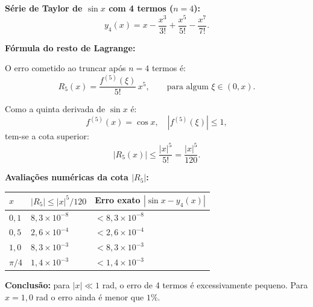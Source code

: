 \textbf{Série de Taylor de $\sin x$ com 4 termos ($n=4$):}
\[
y_4(x) = x - \frac{x^3}{3!} + \frac{x^5}{5!} - \frac{x^7}{7!}.
\]

\textbf{Fórmula do resto de Lagrange:}

O erro cometido ao truncar após $n=4$ termos é:
\[
R_5(x) = \frac{f^{(5)}(\xi)}{5!}\,x^5,\qquad\text{para algum }\xi\in(0,x).
\]

Como a quinta derivada de $\sin x$ é:
\[
f^{(5)}(x) = \cos x,\quad |f^{(5)}(\xi)|\leq1,
\]
tem-se a cota superior:
\[
|R_5(x)|\leq \frac{|x|^5}{5!}=\frac{|x|^5}{120}.
\]

\textbf{Avaliações numéricas da cota $|R_5|$:}
\begin{center}
\begin{tabular}{lll}
\hline
$x$ & $|R_5|\leq|x|^5/120$ & Erro exato $|\sin x - y_4(x)|$ \\
\hline
$0{,}1$ & $8{,}3\times10^{-8}$ & $<8{,}3\times10^{-8}$ \\
$0{,}5$ & $2{,}6\times10^{-4}$ & $<2{,}6\times10^{-4}$ \\
$1{,}0$ & $8{,}3\times10^{-3}$ & $<8{,}3\times10^{-3}$ \\
$\pi/4$ & $1{,}4\times10^{-3}$ & $<1{,}4\times10^{-3}$ \\
\hline
\end{tabular}
\end{center}

\textbf{Conclusão:} para $|x|\ll1$ rad, o erro de 4 termos é excessivamente pequeno. Para $x=1{,}0$ rad o erro ainda é menor que $1\%$.